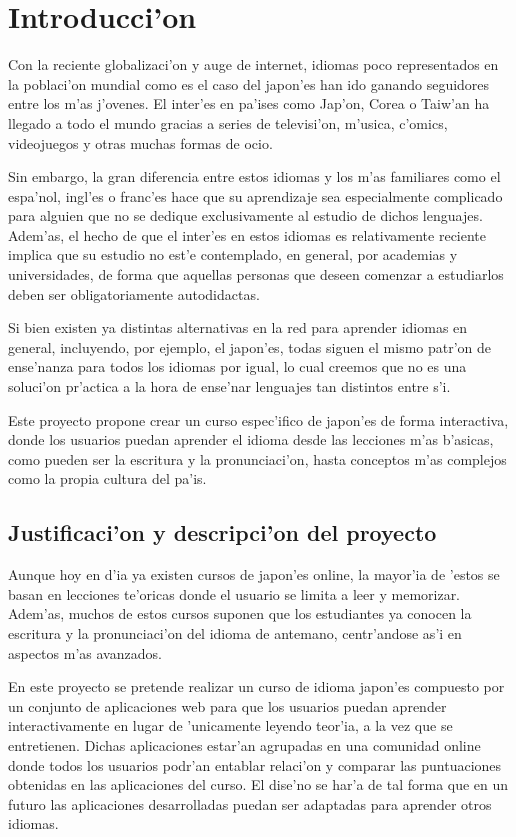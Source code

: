 \section{Introducci'on}
\label{sec:introduccion}


Con la reciente globalizaci'on y auge de internet, idiomas poco representados
en la poblaci'on mundial como es el caso del japon'es han ido ganando seguidores entre
los m'as j'ovenes. El inter'es en pa'ises como Jap'on, Corea o Taiw'an
ha llegado a todo el mundo gracias a series de televisi'on, m'usica, c'omics, videojuegos
y otras muchas formas de ocio.

Sin embargo, la gran diferencia entre estos idiomas y los m'as familiares como el espa'nol,
ingl'es o franc'es hace que su aprendizaje sea especialmente complicado para alguien
que no se dedique exclusivamente al estudio de dichos lenguajes. Adem'as, el hecho de que
el inter'es en estos idiomas es relativamente reciente implica que su estudio no est'e contemplado, en general, 
por academias y universidades, de forma que aquellas personas que deseen comenzar a estudiarlos
deben ser obligatoriamente autodidactas.

Si bien existen ya distintas alternativas en la red para aprender idiomas en general, incluyendo,
por ejemplo, el japon'es, todas siguen el mismo patr'on de ense'nanza para todos los idiomas
por igual, lo cual creemos que no es una soluci'on pr'actica a la hora de ense'nar lenguajes
tan distintos entre s'i.

Este proyecto propone crear un curso espec'ifico de japon'es de forma interactiva, donde
los usuarios puedan aprender el idioma desde las lecciones m'as b'asicas, como pueden ser la
escritura y la pronunciaci'on, hasta conceptos m'as complejos como la propia cultura del pa'is.


\subsection{Justificaci'on y descripci'on del proyecto}
\label{sub:justificacion_y_descripcion_del_proyecto}

Aunque hoy en d'ia ya existen cursos de japon'es online, la mayor'ia de 'estos se basan en lecciones
te'oricas donde el usuario se limita a leer y memorizar. Adem'as, muchos de estos cursos suponen
que los estudiantes ya conocen la escritura y la pronunciaci'on del idioma de antemano, centr'andose
as'i en aspectos m'as avanzados.

En este proyecto se pretende realizar un curso de idioma japon'es compuesto por un conjunto de aplicaciones
web para que los usuarios puedan aprender interactivamente en lugar de 'unicamente
leyendo teor'ia, a la vez que se entretienen. Dichas aplicaciones estar'an
agrupadas en una comunidad online donde todos los usuarios podr'an entablar relaci'on y
comparar las puntuaciones obtenidas en las aplicaciones del curso. El dise'no se har'a de tal
forma que en un futuro las aplicaciones desarrolladas puedan ser adaptadas para aprender
otros idiomas.

